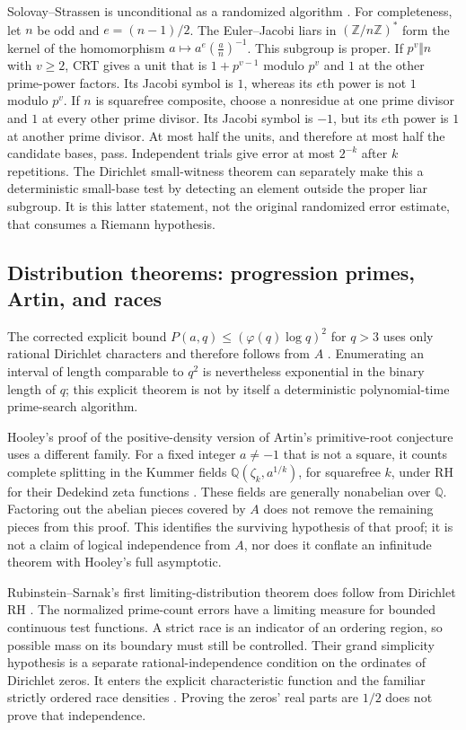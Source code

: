\documentclass[11pt]{article}
\newcommand{\Q}{\mathbb Q}
\newcommand{\Z}{\mathbb Z}
\theoremstyle{definition}
\theoremstyle{remark}
\begin{document}
Solovay--Strassen is unconditional as a randomized algorithm
\citep{SolovayStrassen1977}. For completeness, let $n$ be odd and
$e=(n-1)/2$. The Euler--Jacobi liars in $(\Z/n\Z)^*$ form the kernel of
the homomorphism $a\mapsto a^e\left(\frac an\right)^{-1}$.
This subgroup is proper. If $p^v\Vert n$ with $v\ge2$, CRT gives a unit
that is $1+p^{v-1}$ modulo $p^v$ and $1$ at the other prime-power factors.
Its Jacobi symbol is $1$, whereas its $e$th power is not $1$ modulo $p^v$.
If $n$ is squarefree composite, choose a nonresidue at one prime divisor
and $1$ at every other prime divisor. Its Jacobi symbol is $-1$, but its
$e$th power is $1$ at another prime divisor. At most half the units,
and therefore at most half the candidate bases, pass. Independent trials
give error at most $2^{-k}$ after $k$ repetitions.
The Dirichlet small-witness theorem can separately make this a
deterministic small-base test by detecting an element outside the proper
liar subgroup. It is this latter statement, not the original randomized
error estimate, that consumes a Riemann hypothesis.

\subsection{Distribution theorems: progression primes, Artin, and races}

The corrected explicit bound
$P(a,q)\le(\varphi(q)\log q)^2$ for $q>3$ uses only rational Dirichlet
characters and therefore follows from $A$
\citep[Corollary~1.2, corrected author p.~3]{LLS2015}.
Enumerating an interval of length comparable to $q^2$ is nevertheless
exponential in the binary length of $q$; this explicit theorem is not by
itself a deterministic polynomial-time prime-search algorithm.

Hooley's proof of the positive-density version of Artin's primitive-root
conjecture uses a different family. For a fixed integer $a\ne-1$ that is not a square, it counts
complete splitting in the Kummer fields
$\Q(\zeta_k,a^{1/k})$, for squarefree $k$, under RH for their Dedekind
zeta functions \citep[translation pp.~40--45, 47]{Hooley1967}.
These fields are generally nonabelian over $\Q$. Factoring out the abelian
pieces covered by $A$ does not remove the remaining pieces from this proof.
This identifies the surviving hypothesis of that proof; it is not a claim
of logical independence from $A$, nor does it conflate an infinitude theorem
with Hooley's full asymptotic.

Rubinstein--Sarnak's first limiting-distribution theorem does follow from
Dirichlet RH \citep[Theorem~1.1, p.~174]{RubinsteinSarnak1994}.
The normalized prime-count errors have a limiting measure for bounded
continuous test functions. A strict race is an indicator of an ordering
region, so possible mass on its boundary must still be controlled.
Their grand simplicity hypothesis is a separate rational-independence
condition on the ordinates of Dirichlet zeros. It enters the explicit
characteristic function and the familiar strictly ordered race densities
\citep[pp.~176--177]{RubinsteinSarnak1994}.
Proving the zeros' real parts are $1/2$ does not prove that independence.
\end{document}
